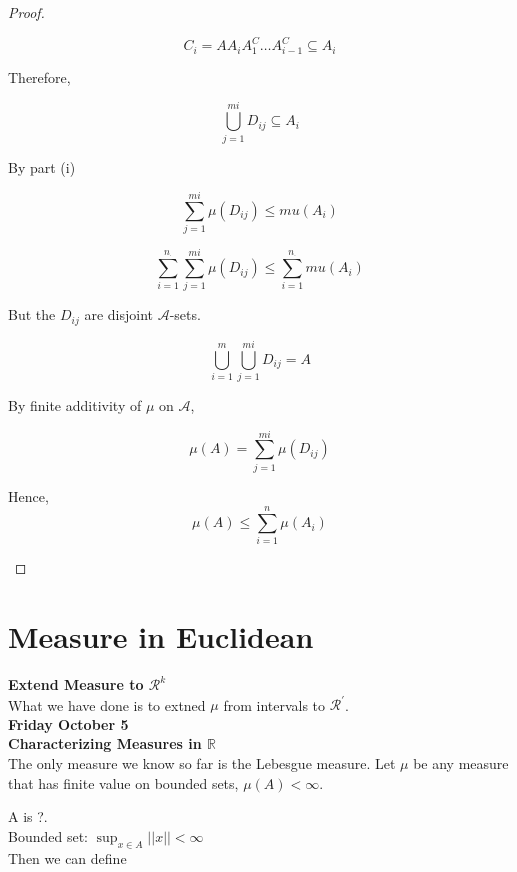 \documentclass[11pt,fleqn]{book} %
\begin{document}
\begin{proof}
\begin{enumerate}
			$$ C_i = A A_i A_1^C \dots A^C_{i-1} \subseteq A_i $$

	Therefore, 

			$$ \bigcup^{mi}_{j=1} D_{ij} \subseteq A_i$$	

	By part (i)

			$$\sum^{mi}_{j=1} \mu(D_{ij}) \leq mu(A_i) $$


			$$ \sum^{n_\cdot}_{i=1} \sum^{mi}_{j=1} \mu(D_{ij}) \leq \sum^{n_\cdot}_{i=1} mu(A_i)$$

	But the $D_{ij}$ are disjoint $\mathcal{A}$-sets. 

			$$ \bigcup^{m}_{i=1} \bigcup^{mi}_{j=1} D_{ij} = A$$

			$$ $$By finite additivity of $\mu$ on $\mathcal{A}$, 

					$$\mu(A) = \sum^{mi}_{j=1} \mu(D_{ij}) $$

	Hence, 
			$$ \mu(A) \leq \sum^n_{i=1} \mu(A_i) $$

	\end{enumerate}
\end{proof}


\section{Measure in Euclidean}


\textbf{Extend Measure to $\mathcal{R}^k$}\\

What we have done is to extned $\mu$ from intervals to $\mathcal{R}^\prime$.\\




\textbf{Friday October 5}\\





\textbf{Characterizing Measures in $\mathbb{R}$}\\

The only measure we know so far is the Lebesgue measure. Let $\mu$ be any measure that has finite value on bounded sets, $\mu(A) < \infty$. 

A is ?. \\

Bounded set: $\sup_{x \in A} ||x|| < \infty$\\

Then we can define


\end{document}
